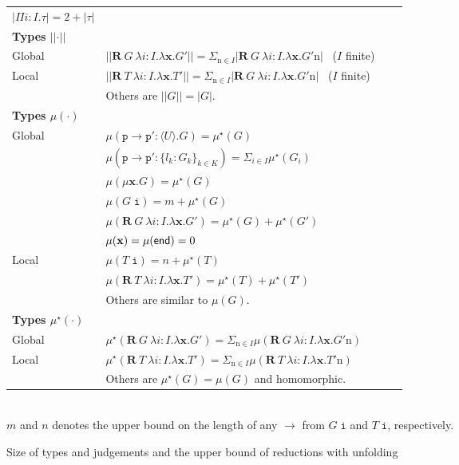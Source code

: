 \documentclass{LMCS}
\newcommand{\kf}[1]{\textup{\textsf{#1}}\xspace}
\newcommand{\participant}[1]{\ensuremath{\mathtt{#1}}}
\newcommand{\p}{\ensuremath{\participant{p}}}
\newcommand{\indexed}[4]{\ensuremath{\{#1_#3 : #2_#3\}_{#3 \in #4}}}
\newcommand{\RECSEQP}[4]{\ensuremath{\mathbf{R} \ #1\ \lambda #2.\lambda #3.#4}}
\newcommand{\G}{\ensuremath{G}}
\newcommand{\U}{\ensuremath{U}}
\newcommand{\T}{\ensuremath{T}}
\newcommand{\End}{\kf{end}}
\newcommand{\ENCan}[1]{\langle #1 \rangle}
\newcommand{\TO}[2]{#1\to #2}
\newcommand{\GS}[3]{\TO{#1}{#2}\colon \!\ENCan{#3}}
\newcommand{\GB}[2]{\TO{#1}{#2}\colon\! \indexed{l}{\G}{k}{K}}
\newcommand{\GR}[4]{\RECSEQP{#1}{#2}{#3}{#4}}
\newcommand{\GM}[2]{\mu #1.#2}
\newcommand{\APP}{\;}
\newcommand{\ii}{\ensuremath{i}}
\newcommand{\n}{\ensuremath{\mathrm{n}}}
\newcommand{\xx}{\ensuremath{\mathbf{x}}}
\newcommand{\II}{\ensuremath{I}}
\newcommand{\AT}[2]{#1\! : \! #2}
\newcommand{\tii}{\ensuremath{\mathtt{i}}}
\newcommand{\termsize}[1]{|#1|}
\newcommand{\inductiontermsize}[1]{\vert\vert #1 \vert\vert}
\newcommand{\reductionsize}[1]{\mu(#1)}
\newcommand{\inductionreductionsize}[1]{\mu^\star(#1)}
\begin{document}
\begin{figure}
\begin{tabular}{l@{\ }l@{\ }l@{\quad}l}
$\termsize{\Pi\AT{\ii}{\II}.\tau}= 2 + \termsize{\tau}$ 
\\[1mm]
{\bf Types $\vert\vert\cdot\vert\vert$}\\[2mm]
Global\quad &
  $\inductiontermsize{\GR{\G}{\AT{\ii}{\II}}{\xx}{\G'}}=
   \Sigma_{\n \in I}\termsize{{\GR{\G}{\AT{\ii}{\II}}{\xx}{\G'}} \n}$
\ ($I$ finite)
\\[1mm]
Local\quad &
$\inductiontermsize{\GR{\T}{\AT{\ii}{\II}}{\xx}{\T'}}=
   \Sigma_{\n \in I}\termsize{{\GR{\G}{\AT{\ii}{\II}}{\xx}{\G'}} \n}$
\ ($I$ finite)
\\[1mm]
&  Others are 
$\inductiontermsize{G}=\termsize{G}$. \\[2mm]
{\bf Types $\reductionsize{\cdot}$}\\[2mm]
Global 
& 
$\reductionsize{\GS{\p}{\p'}{\U}.\G}=\inductionreductionsize{G}$\\
& 
$\reductionsize{\GB{\p}{\p'}}=\Sigma_{i\in I}\inductionreductionsize{G_i}$\\
&
$\reductionsize{\GM{\xx}{\G}}=\inductionreductionsize{G}$\\
&
$\reductionsize{\G\APP \tii}=m+\inductionreductionsize{G}$ \\
& 
  $\reductionsize{\GR{\G}{\AT{\ii}{\II}}{\xx}{\G'}}=
   \inductionreductionsize{G}+\inductionreductionsize{G'}$\\
& $\reductionsize{\xx}=\reductionsize{\End}=0$ 
\\[1mm]
Local 
& 
$\reductionsize{\T\APP \tii}=n+\inductionreductionsize{T}$\\
&  $\reductionsize{\GR{\T}{\AT{\ii}{\II}}{\xx}{\T'}}=
   \inductionreductionsize{T}+\inductionreductionsize{T'}$\\[1mm]
& Others are similar to $\reductionsize{G}$. \\[1mm]
{\bf Types $\inductionreductionsize{\cdot}$}\\[2mm]
Global & $\inductionreductionsize{\GR{\G}{\AT{\ii}{\II}}{\xx}{\G'}}=
  \Sigma_{\n \in I} \reductionsize{\GR{\G}{\AT{\ii}{\II}}{\xx}{\G'} \n}$\\[1mm]
Local & $\inductionreductionsize{\GR{\T}{\AT{\ii}{\II}}{\xx}{\T'}}=
  \Sigma_{\n \in I} \reductionsize{\GR{\T}{\AT{\ii}{\II}}{\xx}{\T'} \n}$\\[1mm]
&  Others are 
$\inductionreductionsize{G}=\reductionsize{G}$ and homomorphic. \\[2mm]
\end{tabular}\\[2mm]
$m$ and $n$ denotes the upper bound on the length of any
$\longrightarrow$ from $\G\APP \tii$ and $\T\APP \tii$, respectively. 

\caption{Size of types and judgements and the upper bound of 
reductions with unfolding} \label{fig:size}
\end{figure}
\end{document}
